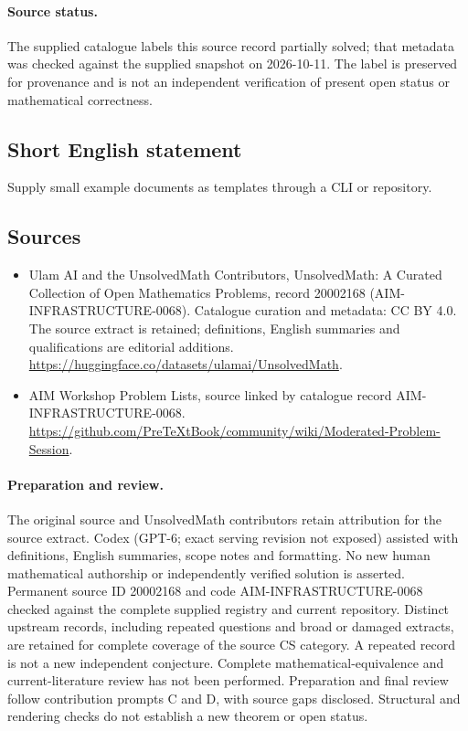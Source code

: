 \documentclass[11pt]{article}
\begin{document}
\paragraph{Source status.}
The supplied catalogue labels this source record partially solved; that metadata was checked against the supplied snapshot on 2026-10-11. The label is preserved for provenance and is not an independent verification of present open status or mathematical correctness.
\subsection{Short English statement}
Supply small example documents as templates through a CLI or repository.
\subsection{Sources}
\begin{itemize}
\item[\hypertarget{source:20002168:1}{S1}] Ulam AI and the UnsolvedMath Contributors, UnsolvedMath: A Curated Collection of Open Mathematics Problems, record 20002168 (AIM-INFRASTRUCTURE-0068). Catalogue curation and metadata: CC BY 4.0. The source extract is retained; definitions, English summaries and qualifications are editorial additions.
\url{https://huggingface.co/datasets/ulamai/UnsolvedMath}.
\item[\hypertarget{source:20002168:2}{S2}] AIM Workshop Problem Lists, source linked by catalogue record AIM-INFRASTRUCTURE-0068.
\url{https://github.com/PreTeXtBook/community/wiki/Moderated-Problem-Session}.
\end{itemize}
\paragraph{Preparation and review.}
The original source and UnsolvedMath contributors retain attribution for the source extract. Codex (GPT-6; exact serving revision not exposed) assisted with definitions, English summaries, scope notes and formatting. No new human mathematical authorship or independently verified solution is asserted. Permanent source ID 20002168 and code AIM-INFRASTRUCTURE-0068 checked against the complete supplied registry and current repository. Distinct upstream records, including repeated questions and broad or damaged extracts, are retained for complete coverage of the source CS category. A repeated record is not a new independent conjecture. Complete mathematical-equivalence and current-literature review has not been performed. Preparation and final review follow contribution prompts C and D, with source gaps disclosed. Structural and rendering checks do not establish a new theorem or open status.
\label{end:20002168}
\end{document}
